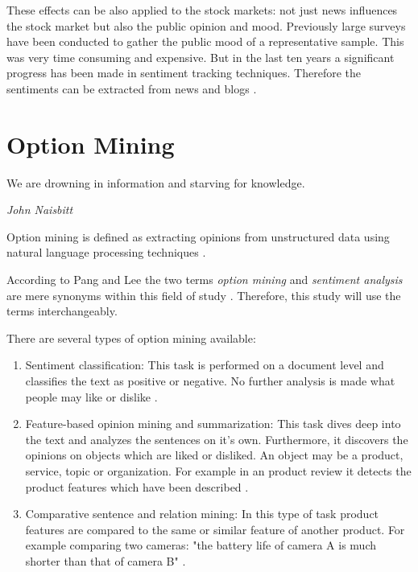 These effects can be also applied to the stock markets: not just news influences the stock market but also the public opinion and mood.
Previously large surveys have been conducted to gather the public mood of a representative sample.
This was very time consuming and expensive.
But in the last ten years a significant progress has been made in sentiment tracking techniques.
Therefore the sentiments can be extracted from news and blogs
\cite{Bollen2011a}.


\section{Option Mining} 
\label{s:background-optionmining}

\epigraph{We are drowning in information and starving for knowledge.}{\textit{John Naisbitt}}

Option mining is defined as extracting opinions from unstructured data using natural language processing techniques \cite[page 411]{Liu2007}.

According to Pang and Lee the two terms \emph{option mining} and \emph{sentiment analysis} are mere synonyms within this field of study \cite{Pang2008c}.
Therefore, this study will use the terms interchangeably.

There are several types of option mining available:

\begin{enumerate}
	\item 
	Sentiment classification: 
	This task is performed on a document level and classifies the text as positive or negative. 
	No further analysis is made what people may like or dislike 
	\cite[page 411]{Liu2007}.
	
	\item 
	Feature-based opinion mining and summarization: 
	This task dives deep into the text and analyzes the sentences on it's own.
	Furthermore, it discovers the opinions on objects which are liked or disliked.
	An object may be a product, service, topic or organization. 
	For example in an product review it detects the product features which have been described 
	\cite[page 412]{Liu2007}.
	
	\item
	Comparative sentence and relation mining:
	In this type of task product features are compared to the same or similar feature of another product.
	For example comparing two cameras: "the battery life of camera A is much shorter than that of camera B" 
	\cite[page 412]{Liu2007}. 
\end{enumerate}

